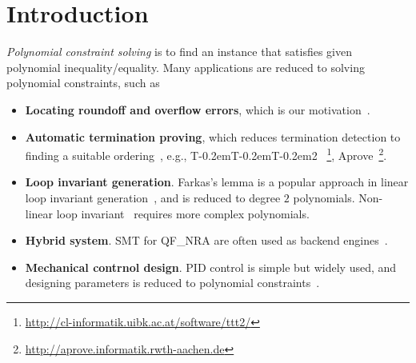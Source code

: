 \documentclass[runningheads,a4paper,oribibl]{llncs}
\newcommand\TTTT{%
 \textsf{T\kern-0.2em\raisebox{-0.3em}T\kern-0.2emT\kern-0.2em\raisebox{-0.3em}2}%
}
\begin{document}
\section{Introduction}
{\em Polynomial constraint solving} is to find an instance 
that satisfies given polynomial inequality/equality. 
%
Many applications are reduced to solving polynomial constraints, such as 
\begin{itemize}
\item {\bf Locating roundoff and overflow errors}, 
which is our motivation~\cite{ngocsefm,ngocase}. 

\item {\bf Automatic termination proving}, 
which reduces termination detection to finding a suitable ordering~\cite{lucas}, 
e.g., \TTTT~\footnote{\url{http://cl-informatik.uibk.ac.at/software/ttt2/}}, 
Aprove~\footnote{\url{http://aprove.informatik.rwth-aachen.de}}. 

\item {\bf Loop invariant generation}. 
Farkas's lemma is a popular approach in linear loop invariant generation~\cite{Colon03}, 
and is reduced to degree $2$ polynomials. 
Non-linear loop invariant~\cite{Sankaranarayanan} requires more complex polynomials.

\item {\bf Hybrid system}. SMT for QF\_NRA are often used as backend engines~\cite{hybrid}. 

\item {\bf Mechanical contrnol design}. 
PID control is simple but widely used, and designing parameters is 
reduced to polynomial constraints~\cite{control}. 
\end{itemize}	
\end{document}
